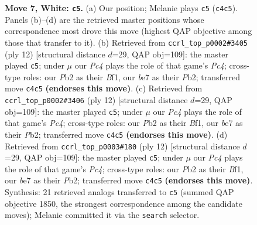 \documentclass[11pt]{article}
\begin{document}
\begin{figure}[p]
\caption{\textbf{Move 7, White: \texttt{c5}.} (a) Our position; Melanie plays \texttt{c5} (\texttt{c4c5}). Panels (b)--(d) are the retrieved master positions whose correspondence most drove this move (highest QAP objective among those that transfer to it). (b) Retrieved from \texttt{ccrl\_top\_p0002\#3405} (ply 12) [structural distance $d$=29, QAP obj=109]: the master played \texttt{c5}; under $\mu$ our \emph{Pc4} plays the role of that game's \emph{Pc4}; cross-type roles: our \emph{P}b2 as their \emph{B}f1, our \emph{b}e7 as their \emph{P}b2; transferred move \texttt{c4c5} \textbf{(endorses this move)}. (c) Retrieved from \texttt{ccrl\_top\_p0002\#3406} (ply 12) [structural distance $d$=29, QAP obj=109]: the master played \texttt{c5}; under $\mu$ our \emph{Pc4} plays the role of that game's \emph{Pc4}; cross-type roles: our \emph{P}b2 as their \emph{B}f1, our \emph{b}e7 as their \emph{P}b2; transferred move \texttt{c4c5} \textbf{(endorses this move)}. (d) Retrieved from \texttt{ccrl\_top\_p0003\#180} (ply 12) [structural distance $d$=29, QAP obj=109]: the master played \texttt{c5}; under $\mu$ our \emph{Pc4} plays the role of that game's \emph{Pc4}; cross-type roles: our \emph{P}b2 as their \emph{B}f1, our \emph{b}e7 as their \emph{P}b2; transferred move \texttt{c4c5} \textbf{(endorses this move)}. Synthesis: 21 retrieved analogs transferred to \texttt{c5} (summed QAP objective 1850, the strongest correspondence among the candidate moves); Melanie committed it via the \texttt{search} selector.}
\label{fig:thought-m12}
\end{figure}

\clearpage
\end{document}
